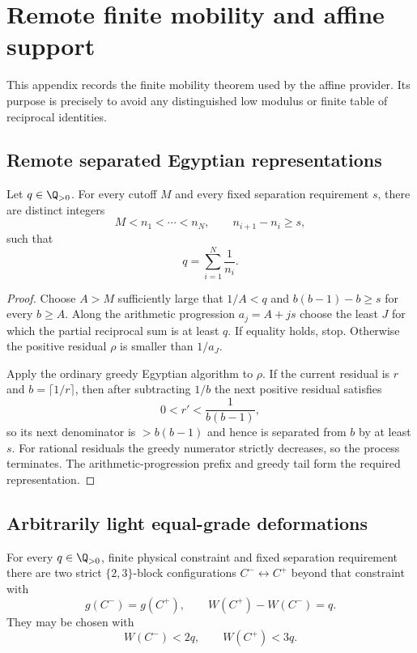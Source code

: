\section{Remote finite mobility and affine support}\label{app:finite-mobility}

This appendix records the finite mobility theorem used by the affine provider.
Its purpose is precisely to avoid any distinguished low modulus or finite table
of reciprocal identities.

\subsection{Remote separated Egyptian representations}

\begin{lemma}\label{lem:remote-egyptian}
Let $q\in\Q_{>0}$. For every cutoff $M$ and every fixed separation requirement
$s$, there are distinct integers
\[
M<n_1<\cdots<n_N,
\qquad n_{i+1}-n_i\ge s,
\]
such that
\[
q=\sum_{i=1}^N\frac1{n_i}.
\]
\end{lemma}

\begin{proof}
Choose $A>M$ sufficiently large that $1/A<q$ and
$b(b-1)-b\ge s$ for every $b\ge A$. Along the arithmetic progression
$a_j=A+js$ choose the least $J$ for which the partial reciprocal sum is at
least $q$. If equality holds, stop. Otherwise the positive residual $\rho$ is
smaller than $1/a_J$.

Apply the ordinary greedy Egyptian algorithm to $\rho$. If the current
residual is $r$ and $b=\lceil1/r\rceil$, then after subtracting $1/b$ the next
positive residual satisfies
\[
0<r'<\frac1{b(b-1)},
\]
so its next denominator is $>b(b-1)$ and hence is separated from $b$ by at
least $s$. For rational residuals the greedy numerator strictly decreases,
so the process terminates. The arithmetic-progression prefix and greedy tail
form the required representation.
\end{proof}

\subsection{Arbitrarily light equal-grade deformations}

\begin{lemma}\label{lem:equalgrade-deformation}
For every $q\in\Q_{>0}$, finite physical constraint and fixed separation
requirement there are two strict $\{2,3\}$-block configurations
$C^-\leftrightarrow C^+$ beyond that constraint with
\[
g(C^-)=g(C^+),
\qquad
W(C^+)-W(C^-)=q.
\]
They may be chosen with
\[
W(C^-)<2q,
\qquad
W(C^+)<3q.
\]
\end{lemma}

